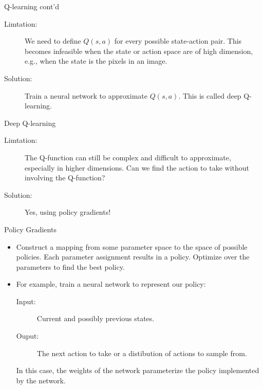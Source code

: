 \documentclass{beamer}
\begin{document}
\begin{frame}{Q-learning cont'd}
  \begin{description}
  \item[Limtation:] We need to define $Q(s,a)$ for every possible state-action pair. This becomes infeasible when the state or action space are of high dimension, e.g., when the state is the pixels in an image.
  \item[Solution:] Train a neural network to approximate $Q(s,a)$. This is called deep Q-learning.
  \end{description}
\end{frame}

\begin{frame}{Deep Q-learning}
  \begin{description}
  \item[Limtation:] The Q-function can still be complex and difficult to approximate, especially in higher dimensions. Can we find the action to take without involving the Q-function?
  \item[Solution:] Yes, using policy gradients!
  \end{description}
\end{frame}

\begin{frame}{Policy Gradients}
  \begin{itemize}
  \item Construct a mapping from some parameter space to the space of possible policies. Each parameter assignment results in a policy. Optimize over the parameters to find the best policy.
  \item For example, train a neural network to represent our policy:
  \begin{description}
  \item[Input:] Current and possibly previous states.
  \item[Ouput:] The next action to take or a distibution of actions to sample from.
  \end{description}
  In this case, the weights of the network parameterize the policy implemented by the network.
  \end{itemize}
\end{frame}
\end{document}
